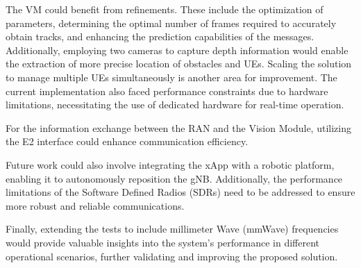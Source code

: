 The VM could benefit from refinements.
These include the optimization of parameters, determining the optimal number of frames required to accurately obtain tracks, and enhancing the prediction capabilities of the messages.
Additionally, employing two cameras to capture depth information would enable the extraction of more precise location of obstacles and UEs.
Scaling the solution to manage multiple UEs simultaneously is another area for improvement.
The current implementation also faced performance constraints due to hardware limitations, necessitating the use of dedicated hardware for real-time operation.

For the information exchange between the RAN and the Vision Module, utilizing the E2 interface could enhance communication efficiency.

Future work could also involve integrating the xApp with a robotic platform, enabling it to autonomously reposition the gNB\@.
Additionally, the performance limitations of the Software Defined Radios (SDRs) need to be addressed to ensure more robust and reliable communications.

Finally, extending the tests to include millimeter Wave (mmWave) frequencies would provide valuable insights into the system's performance in different operational scenarios, further validating and improving the proposed solution.





    


